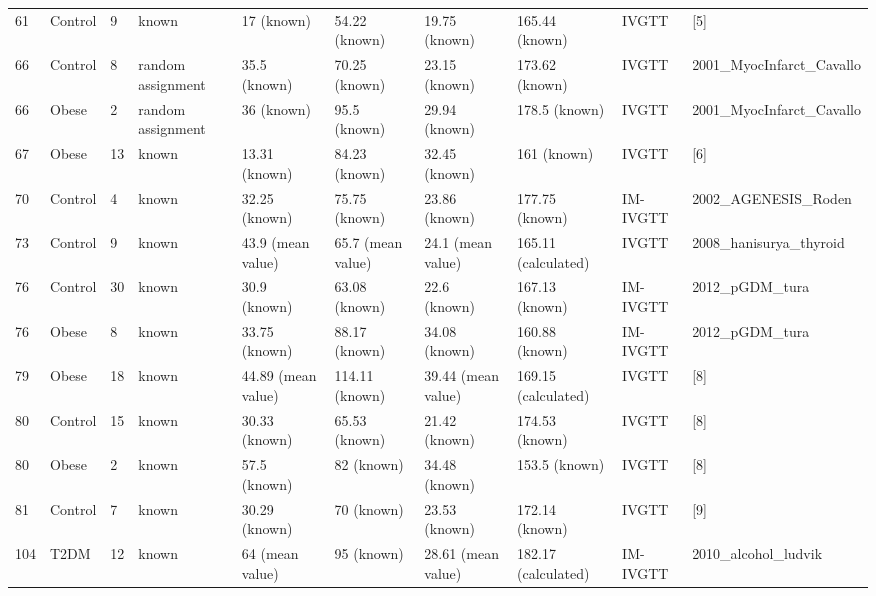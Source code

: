 \documentclass[utf8]{frontiersSCNS} %
\begin{document}
\begin{table}[h]
{\begin{tabular}{llllllllll}
61  & Control & 9  & known             & 17 (known)         & 54.22 (known)  & 19.75 (known)      & 165.44 (known)      & IVGTT    & {[}5{]}                    \\
66 &
  Control &
  8 &
  random assignment &
  35.5 (known) &
  70.25 (known) &
  23.15 (known) &
  173.62 (known) &
  IVGTT &
  2001\_MyocInfarct\_Cavallo \\
66  & Obese   & 2  & random assignment & 36 (known)         & 95.5 (known)   & 29.94 (known)      & 178.5 (known)       & IVGTT    & 2001\_MyocInfarct\_Cavallo \\
67  & Obese   & 13 & known             & 13.31 (known)      & 84.23 (known)  & 32.45 (known)      & 161 (known)         & IVGTT    & {[}6{]}                    \\
70  & Control & 4  & known             & 32.25 (known)      & 75.75 (known)  & 23.86 (known)      & 177.75 (known)      & IM-IVGTT & 2002\_AGENESIS\_Roden      \\
73 &
  Control &
  9 &
  known &
  43.9 (mean value) &
  65.7 (mean value) &
  24.1 (mean value) &
  165.11 (calculated) &
  IVGTT &
  2008\_hanisurya\_thyroid \\
76  & Control & 30 & known             & 30.9 (known)       & 63.08 (known)  & 22.6 (known)       & 167.13 (known)      & IM-IVGTT & 2012\_pGDM\_tura           \\
76  & Obese   & 8  & known             & 33.75 (known)      & 88.17 (known)  & 34.08 (known)      & 160.88 (known)      & IM-IVGTT & 2012\_pGDM\_tura           \\
79  & Obese   & 18 & known             & 44.89 (mean value) & 114.11 (known) & 39.44 (mean value) & 169.15 (calculated) & IVGTT    & {[}8{]}                    \\
80  & Control & 15 & known             & 30.33 (known)      & 65.53 (known)  & 21.42 (known)      & 174.53 (known)      & IVGTT    & {[}8{]}                    \\
80  & Obese   & 2  & known             & 57.5 (known)       & 82 (known)     & 34.48 (known)      & 153.5 (known)       & IVGTT    & {[}8{]}                    \\
81  & Control & 7  & known             & 30.29 (known)      & 70 (known)     & 23.53 (known)      & 172.14 (known)      & IVGTT    & {[}9{]}                    \\
104 & T2DM    & 12 & known             & 64 (mean value)    & 95 (known)     & 28.61 (mean value) & 182.17 (calculated) & IM-IVGTT & 2010\_alcohol\_ludvik      \\

\end{tabular}}
\end{table}
\end{document}
